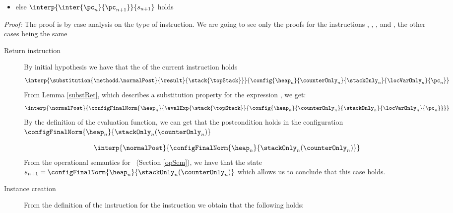 \begin{lemma}
\begin{itemize}
       \item  else $ \interp{\inter{\pc_n}{\pc_{n+1}}}{s_{n+1}}  $   holds 
  \end{itemize} 
\end{lemma}
\textit{Proof:}
The proof is by case analysis on the type of instruction. %
We are going to see only the proofs for the instructions 
\return , \load, \new, \putfield{} and \invoke{}, the other cases being the same
\begin{description} 
		\item[ Return instruction]
		  By initial hypothesis we have that the \wpName{} of the current instruction holds
		 \begin{equation*}
          \interp {\substitution{ \methodd.\normalPost }{ \result }{\stack{\topStack} }}  { \config{\heap_n }{\counterOnly_n }{\stackOnly_n }{\locVarOnly_n }{\pc_n } }  
\end{equation*}
		 From Lemma \ref{substRet}, which describes a substitution property for the expression \result, we get:  
		  $$\interp { \normalPost} { \configFinalNorm{\heap_n  }
				                                   { \evalExp{ \stack{\topStack}}{\config{\heap_n }{\counterOnly_n }{\stackOnly_n }{\locVarOnly_n }{\pc_n } } }
                         }$$
			 By the definition of the evaluation function, we can get that the postcondition \normalPost{} 
			 holds in the configuration  $\configFinalNorm{\heap_n  }   { \stackOnly_n ( \counterOnly_n  )  }$
			
			 $$  \interp{ \normalPost} { \configFinalNorm{\heap_n  }  
							    { \stackOnly_n ( \counterOnly_n  )  } } $$
			From the operational semantics for \return \ (Section \ref{opSem}), we have that the state  $ s_{n+1} = \configFinalNorm{\heap_n  } { \stackOnly_n ( \counterOnly_n  )  }$
			which allows us to conclude that this case holds.
							    
	
			 
	\item [Instance creation]
	        From the definition of the \wpName{} instruction for the instruction \new{} we obtain that the following holds:
			 

\end{description}
